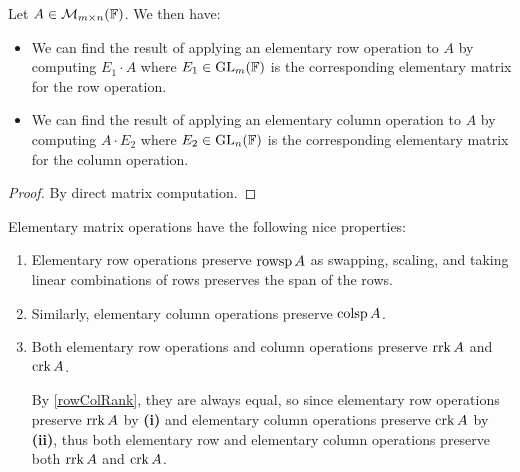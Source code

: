 \documentclass[../main.tex]{subfiles}
\begin{document}
\begin{lemma}
  Let $A \in \mathcal{M}_{m \times n}(\mathbb{F})$.
  We then have:
  \begin{itemize}
    \item We can find the result of applying an elementary row operation to $A$ by computing $E_1 \cdot A$ where $E_1 \in \mathrm{GL}_m(\mathbb{F})$ is the corresponding elementary matrix for the row operation.
    \item We can find the result of applying an elementary column operation to $A$ by computing $A \cdot E_2$ where $E_2 \in \mathrm{GL}_n(\mathbb{F})$ is the corresponding elementary matrix for the column operation.
  \end{itemize}
\end{lemma}
\begin{proof}
  By direct matrix computation.
\end{proof}
Elementary matrix operations have the following nice properties:
\begin{enumerate}
  \item Elementary row operations preserve $\operatorname{rowsp} A$ as swapping, scaling, and taking linear combinations of rows preserves the span of the rows.
  \item Similarly, elementary column operations preserve $\operatorname{colsp} A$.
  \item Both elementary row operations and column operations preserve $\operatorname{rrk} A$ and $\operatorname{crk} A$.

    By \cref{rowColRank}, they are always equal, so since elementary row operations preserve $\operatorname{rrk} A$ by \textbf{(i)} and elementary column operations preserve $\operatorname{crk} A$ by \textbf{(ii)}, thus both elementary row and elementary column operations preserve both $\operatorname{rrk} A$ and $\operatorname{crk} A$.
\end{enumerate}
\end{document}
